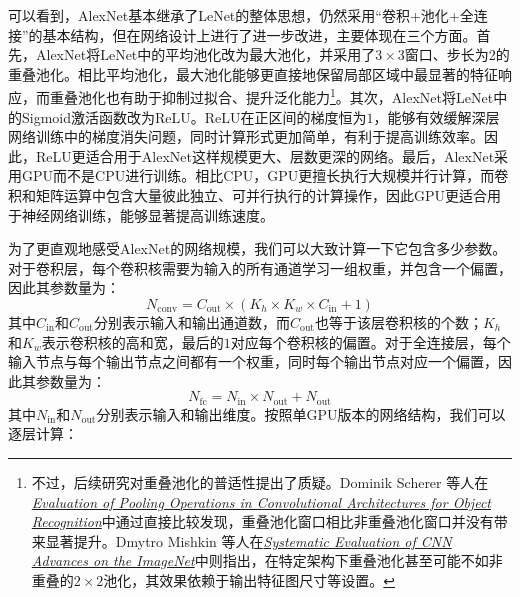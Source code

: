 可以看到，AlexNet基本继承了LeNet的整体思想，仍然采用“卷积+池化+全连接”的基本结构，但在网络设计上进行了进一步改进，主要体现在三个方面。首先，AlexNet将LeNet中的平均池化改为最大池化，并采用了$3\times3$窗口、步长为2的重叠池化。相比平均池化，最大池化能够更直接地保留局部区域中最显著的特征响应，而重叠池化也有助于抑制过拟合、提升泛化能力\footnote{不过，后续研究对重叠池化的普适性提出了质疑。Dominik Scherer 等人在\href{https://dl.acm.org/doi/abs/10.5555/1886436.1886447}{\textit{Evaluation of Pooling Operations in Convolutional Architectures for Object Recognition}}中通过直接比较发现，重叠池化窗口相比非重叠池化窗口并没有带来显著提升。Dmytro Mishkin 等人在\href{https://arxiv.org/abs/1606.02228}{\textit{Systematic Evaluation of CNN Advances on the ImageNet}}中则指出，在特定架构下重叠池化甚至可能不如非重叠的$2\times2$池化，其效果依赖于输出特征图尺寸等设置。}。其次，AlexNet将LeNet中的Sigmoid激活函数改为ReLU。ReLU在正区间的梯度恒为$1$，能够有效缓解深层网络训练中的梯度消失问题，同时计算形式更加简单，有利于提高训练效率。因此，ReLU更适合用于AlexNet这样规模更大、层数更深的网络。最后，AlexNet采用GPU而不是CPU进行训练。相比CPU，GPU更擅长执行大规模并行计算，而卷积和矩阵运算中包含大量彼此独立、可并行执行的计算操作，因此GPU更适合用于神经网络训练，能够显著提高训练速度。

为了更直观地感受AlexNet的网络规模，我们可以大致计算一下它包含多少参数。对于卷积层，每个卷积核需要为输入的所有通道学习一组权重，并包含一个偏置，因此其参数量为：
$$
N_{\mathrm{conv}}=C_{\mathrm{out}}\times\left(K_h\times K_w\times C_{\mathrm{in}}+1\right)
$$
其中$C_{\mathrm{in}}$和$C_{\mathrm{out}}$分别表示输入和输出通道数，而$C_{\mathrm{out}}$也等于该层卷积核的个数；$K_h$和$K_w$表示卷积核的高和宽，最后的$1$对应每个卷积核的偏置。对于全连接层，每个输入节点与每个输出节点之间都有一个权重，同时每个输出节点对应一个偏置，因此其参数量为：
$$
N_{\mathrm{fc}}=N_{\mathrm{in}}\times N_{\mathrm{out}}+N_{\mathrm{out}}
$$
其中$N_{\mathrm{in}}$和$N_{\mathrm{out}}$分别表示输入和输出维度。按照单GPU版本的网络结构，我们可以逐层计算：

